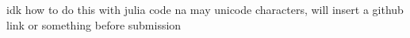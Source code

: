 idk how to do this with julia code na may unicode characters, will insert a github link or something before submission






%  

